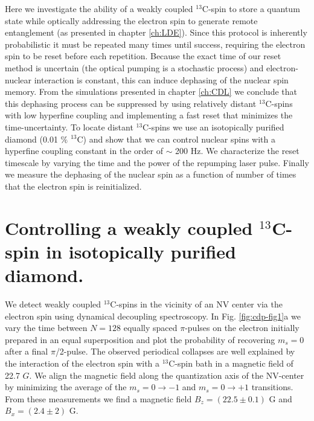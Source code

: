 Here we investigate the ability of a weakly coupled $^{13}$C-spin to store a quantum state while optically addressing the electron spin to generate remote entanglement (as presented in chapter \ref{ch:LDE}). Since this protocol \cite{Barrett_Phys.Rev.A_2005,Bernien_Nature_2013} is inherently probabilistic it must be repeated many times until success, requiring the electron spin to be reset before each repetition. Because the exact time of our reset method is uncertain (the optical pumping is a stochastic process) and electron-nuclear interaction is constant, this can induce dephasing of the nuclear spin memory. From the simulations presented in chapter \ref{ch:CDL} we conclude that this dephasing process can be suppressed by using relatively distant $^{13}$C-spins with low hyperfine coupling and implementing a fast reset that minimizes the time-uncertainty. To locate distant $^{13}$C-spins we use an isotopically purified diamond (0.01 $\%$ $^{13}$C) and show that we can control nuclear spins with a hyperfine coupling constant in the order of $\sim$ 200 Hz. We characterize the reset timescale by varying the time and the power of the repumping laser pulse. Finally we measure the dephasing of the nuclear spin as a function of number of times that the electron spin is reinitialized.

\section{Controlling a weakly coupled $^{13}$C-spin in isotopically purified diamond.}

We detect weakly coupled $^{13}$C-spins in the vicinity of an NV center via the electron spin using dynamical decoupling spectroscopy\cite{Taminiau_Phys.Rev.Lett._2012,Zhao_NatNano_2012,Kolkowitz_Phys.Rev.Lett._2012}. In Fig. \ref{fig:cdp-fig1}a we vary the time between $N = 128$ equally spaced $\pi$-pulses on the electron initially prepared in an equal superposition and plot the probability of recovering $m_s = 0$ after a final $\pi$/2-pulse. The observed periodical collapses\cite{Childress_Science_2006} are well explained by the interaction of the electron spin with a $^{13}$C-spin bath in a magnetic field of 22.7 $G$. We align the magnetic field along the quantization axis of the NV-center by minimizing the average of the $m_s = 0 \rightarrow -1$ and $m_s = 0 \rightarrow +1$ transitions. From these measurements we find a magnetic field $B_z = (22.5 \pm 0.1) $ G and $B_x = (2.4 \pm 2) $ G.

